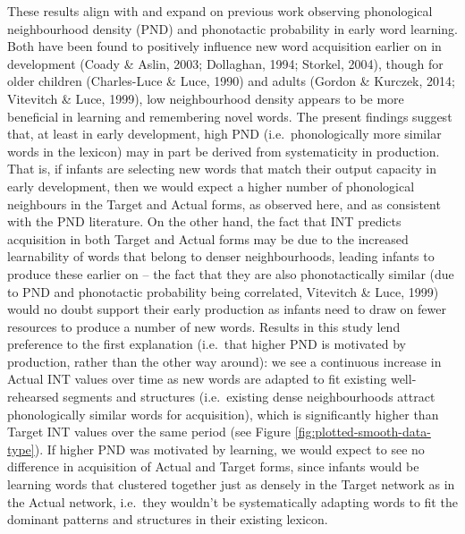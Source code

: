 \documentclass[
  man]{apa6}
\begin{document}
These results align with and expand on previous work observing phonological neighbourhood density (PND) and phonotactic probability in early word learning. Both have been found to positively influence new word acquisition earlier on in development (Coady \& Aslin, 2003; Dollaghan, 1994; Storkel, 2004), though for older children (Charles-Luce \& Luce, 1990) and adults (Gordon \& Kurczek, 2014; Vitevitch \& Luce, 1999), low neighbourhood density appears to be more beneficial in learning and remembering novel words. The present findings suggest that, at least in early development, high PND (i.e.~phonologically more similar words in the lexicon) may in part be derived from systematicity in production. That is, if infants are selecting new words that match their output capacity in early development, then we would expect a higher number of phonological neighbours in the Target and Actual forms, as observed here, and as consistent with the PND literature. On the other hand, the fact that INT predicts acquisition in both Target and Actual forms may be due to the increased learnability of words that belong to denser neighbourhoods, leading infants to produce these earlier on -- the fact that they are also phonotactically similar (due to PND and phonotactic probability being correlated, Vitevitch \& Luce, 1999) would no doubt support their early production as infants need to draw on fewer resources to produce a number of new words. Results in this study lend preference to the first explanation (i.e.~that higher PND is motivated by production, rather than the other way around): we see a continuous increase in Actual INT values over time as new words are adapted to fit existing well-rehearsed segments and structures (i.e.~existing dense neighbourhoods attract phonologically similar words for acquisition), which is significantly higher than Target INT values over the same period (see Figure \ref{fig:plotted-smooth-data-type}). If higher PND was motivated by learning, we would expect to see no difference in acquisition of Actual and Target forms, since infants would be learning words that clustered together just as densely in the Target network as in the Actual network, i.e.~they wouldn't be systematically adapting words to fit the dominant patterns and structures in their existing lexicon.
\end{document}
